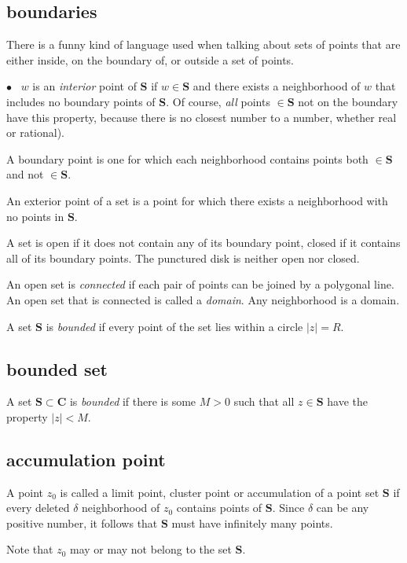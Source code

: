\documentclass[11pt, oneside]{article}
\begin{document}
\subsection*{boundaries}

There is a funny kind of language used when talking about sets of points that are either inside, on the boundary of, or outside a set of points.  

$\bullet$ \ $w$ is an \emph{interior} point of $\mathbf{S}$ if $w \in \mathbf{S}$ and there exists a neighborhood of $w$ that includes no boundary points of $\mathbf{S}$.  Of course, \emph{all} points $\in \mathbf{S}$ not on the boundary have this property, because there is no closest number to a number, whether real or rational).

A boundary point is one for which each neighborhood contains points both $\in \mathbf{S}$ and not $\in \mathbf{S}$.

An exterior point of a set is a point for which there exists a neighborhood with no points in $\mathbf{S}$.

A set is open if it does not contain any of its boundary point, closed if it contains all of its boundary points.  The punctured disk is neither open nor closed.

An open set is \emph{connected} if each pair of points can be joined by a polygonal line.  An open set that is connected is called a \emph{domain}.  Any neighborhood is a domain.

A set $\mathbf{S}$ is \emph{bounded} if every point of the set lies within a circle $|z| = R$.

\subsection*{bounded set}
A set $\mathbf{S} \subset \mathbf{C}$ is \emph{bounded} if there is some $M > 0$ such that all $z \in \mathbf{S}$ have the property $|z| < M$.

\subsection*{accumulation point}
A point $z_0$ is called a limit point, cluster point or accumulation of a point set $\mathbf{S}$ if every deleted $\delta$ neighborhood of $z_0$ contains points of $\mathbf{S}$.  Since $\delta$ can be any positive number, it follows that $\mathbf{S}$ must have infinitely many points.  

Note that $z_0$ may or may not belong to the set $\mathbf{S}$.
\end{document}
